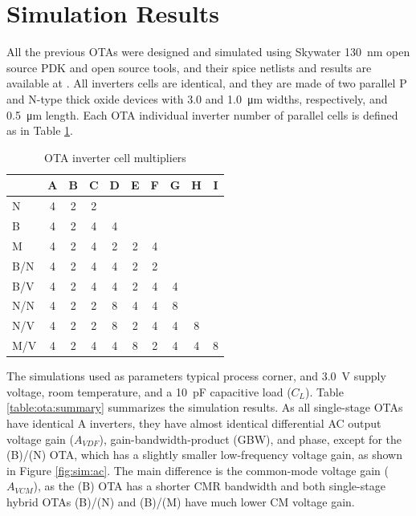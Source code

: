 \documentclass[conference]{IEEEtran}
\begin{document}
	\section{Simulation Results}\label{sc:results}
	
	All the previous OTAs were designed and simulated using Skywater 130~nm open source PDK and open source tools, and their spice netlists and results are available at \cite{repo}. All inverters cells are identical, and they are made of two parallel P and N-type thick oxide devices with 3.0 and 1.0~μm widths, respectively, and 0.5~μm length. Each OTA individual inverter number of parallel cells is defined as in Table \ref{table:ota:sizing}.
	
	\begin{table}[htbp]
		\caption{OTA inverter cell multipliers}\label{table:ota:sizing}
		\centering
		\begin{tabular}{l|c c c c c c c c c}
			& A & B & C & D & E & F & G & H & I \\
			\hline
			N   & 4 & 2 & 2 &   &   &   &   &   &   \\
			B   & 4 & 2 & 4 & 4 &   &   &   &   &   \\
			M   & 4 & 2 & 4 & 2 & 2 & 4 &   &   &   \\
			B/N & 4 & 2 & 4 & 4 & 2 & 2 &   &   &   \\
			B/V & 4 & 2 & 4 & 4 & 2 & 4 & 4 &   &   \\
			N/N & 4 & 2 & 2 & 8 & 4 & 4 & 8 &   &   \\
			N/V & 4 & 2 & 2 & 8 & 2 & 4 & 4 & 8 &   \\
			M/V & 4 & 2 & 4 & 4 & 8 & 2 & 4 & 4 & 8 \\
		\end{tabular}
	\end{table}
	
	The simulations used as parameters typical process corner, and 3.0~V supply voltage, room temperature, and a 10~pF capacitive load ($C_L$). Table \ref{table:ota:summary} summarizes the simulation results. As all single-stage OTAs have identical A inverters, they have almost identical differential AC output voltage gain ($A_{VDF}$), gain-bandwidth-product (GBW), and phase, except for the (B)/(N) OTA, which has a slightly smaller low-frequency voltage gain, as shown in Figure \ref{fig:sim:ac}. The main difference is the common-mode voltage gain ($A_{VCM}$), as the (B) OTA has a shorter CMR bandwidth and both single-stage hybrid OTAs (B)/(N) and (B)/(M) have much lower CM voltage gain.
	
\end{document}
